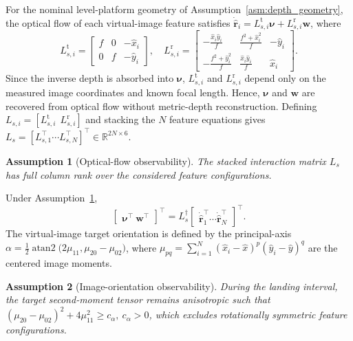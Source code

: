\documentclass[10pt,conference]{IEEEtran}
\newtheorem{assumption}{Assumption}
\begin{document}
For the nominal level-platform geometry of Assumption~\ref{asm:depth_geometry}, the optical flow of each virtual-image feature satisfies $\dot{\hat{\boldsymbol{r}}}_i = L_{s,i}^\text{t}\boldsymbol{\nu} + L_{s,i}^\text{r}\boldsymbol{w}$, where
\begin{equation*}
L_{s,i}^\text{t} = \begin{bmatrix} f & 0 & -\hat{x}_i \\ 0 & f & -\hat{y}_i \end{bmatrix}, \quad
L_{s,i}^\text{r} = \begin{bmatrix} -\frac{\hat{x}_i\hat{y}_i}{f} & \frac{f^2+\hat{x}_i^2}{f} & -\hat{y}_i \\ -\frac{f^2+\hat{y}_i^2}{f} & \frac{\hat{x}_i\hat{y}_i}{f} & \hat{x}_i \end{bmatrix}.
\end{equation*}
Since the inverse depth is absorbed into $\boldsymbol\nu$, $L_{s,i}^\text{t}$ and $L_{s,i}^\text{r}$ depend only on the measured image coordinates and known focal length. Hence, $\boldsymbol\nu$ and $\boldsymbol w$ are recovered from optical flow without metric-depth reconstruction. Defining $L_{s,i}=[L_{s,i}^\text{t}~~L_{s,i}^\text{r}]$ and stacking the $N$ feature equations gives $L_s=[L_{s,1}^\top \cdots L_{s,N}^\top]^\top\in\mathbb{R}^{2N\times 6}$.

\begin{assumption}[Optical-flow observability]
\label{asm:flow_observability}
The stacked interaction matrix $L_s$ has full column rank
over the considered feature configurations.
\end{assumption}

Under Assumption~\ref{asm:flow_observability},
\begin{equation}
    \begin{bmatrix} \boldsymbol{\nu}^\top~\boldsymbol{w}^\top\end{bmatrix}^\top = L_s^\dagger\begin{bmatrix}\dot{\hat{\boldsymbol{r}}}_1^\top \cdots \dot{\hat{\boldsymbol{r}}}_N^\top\end{bmatrix}^\top.
    \label{optic flow inverse: equation}
\end{equation}
The virtual-image target orientation is defined by the principal-axis $\alpha =  \frac{1}{2}\operatorname{atan2}\big(2\mu_{11},\mu_{20}-\mu_{02}\big)$, where $\mu_{pq} = \sum_{i=1}^{N}(\hat{x}_i - \hat{x})^p(\hat{y}_i - \hat{y})^q$ are the centered image moments.

\begin{assumption}[Image-orientation observability]
\label{asm:orientation_observability}
During the landing interval, the target second-moment tensor remains anisotropic such that $\left(\mu_{20}-\mu_{02}\right)^2 + 4\mu_{11}^2 \ge c_\alpha, ~ c_\alpha>0$, which excludes rotationally symmetric feature configurations.
\end{assumption}
\end{document}
